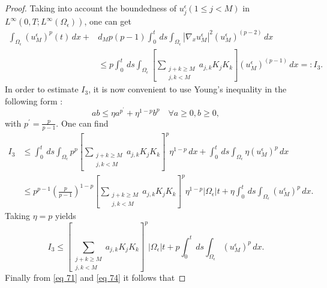 \begin{proof}
Taking into account the boundedness of $u_{j}^{\epsilon}(1 \leq j<M)$ in $L^{\infty}\left(0, T ; L^{\infty}\left(\Omega_{\epsilon}\right)\right)$, one can get
\begin{equation}
  \begin{aligned}
\int_{\Omega_{\epsilon}}\left(u_{M}^{\epsilon}\right)^{p}(t) \, {d} x+& d_{M} p(p-1) \int_{0}^{t} \, d  s \int_{\Omega_{\epsilon}}\left|\nabla_{x} u_{M}^{\epsilon}\right|^{2}\left(u_{M}^{\epsilon}\right)^{(p-2)} \, {d} x \\
& \leq p \int_{0}^{t} \, d  s \int_{\Omega_{\epsilon}}\left[\sum_{\substack{j+k \geq M \\
j,k<M}} a_{j, k} K_{j} K_{k}\right]\left(u_{M}^{\epsilon}\right)^{(p-1)} \, {d} x =: I_{3}.
\end{aligned}
\label{eq 71}\end{equation}
In order to estimate $I_{3}$, it is now convenient to use Young's inequality in the following form \cite{Brezis_2011}:
\begin{equation}
  a b \leq \eta a^{p^{\prime}}+\eta^{1-p}b^{p} \quad \forall a \geq 0, b \geq 0,
\label{eq 72}\end{equation}
with $p^{\prime}=\frac{p}{p-1}$. One can find
\begin{equation}
  \begin{aligned}
I_{3} & \leq \int_{0}^{t} \, d  s \int_{\Omega_{\epsilon}} p^{p}\left[\sum_{\substack{j+k \geq M \\
j,k<M \\}} a_{j, k} K_{j} K_{k}\right]^{p} \eta^{1-p} \, d  x+\int_{0}^{t} \, d  s \int_{\Omega_{\epsilon}} \eta\left(u_{M}^{\epsilon}\right)^{p} \, d  x \\
& \leq p^{p-1}\left(\frac{p}{p-1}\right)^{1-p}\left[\sum_{\substack{j+k \geq M \\
j,k<M}} a_{j, k} K_{j} K_{k}\right]^{p} \eta^{1-p}\left|\Omega_{\epsilon}\right| t+\eta \int_{0}^{t} \, d  s \int_{\Omega_{\epsilon}}\left(u_{M}^{\epsilon}\right)^{p} \, d  x.
\end{aligned}
\label{eq 73}\end{equation}
Taking $\eta=p$ yields
\begin{equation}
  I_{3} \leq\left[\sum_{\substack{j+k \geq M \\
j,k<M}} a_{j, k} K_{j} K_{k}\right]^{p}\left|\Omega_{\epsilon}\right| t+p \int_{0}^{t} \, d  s \int_{\Omega_{\epsilon}}\left(u_{M}^{\epsilon}\right)^{p} \, d  x.
\label{eq 74}\end{equation}
Finally from \eqref{eq 71} and \eqref{eq 74} it follows that

\end{proof}
